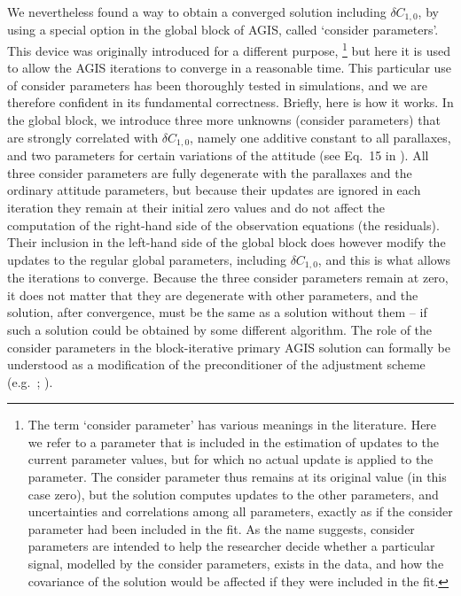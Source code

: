 \documentclass[longauth]{aa} %
\begin{document}
We nevertheless found a way to obtain a converged solution including $\delta C_{1,0}$, by
using a special option in the global block of AGIS, called `consider parameters'. This device
was originally introduced for a different purpose,%
\footnote{The term `consider parameter' has various meanings in
the literature. Here we refer to a parameter that is included in the
estimation of updates to the current parameter values, but for which
no actual update is applied to the parameter. The consider parameter thus remains
at its original value (in this case zero), but the solution computes updates to the
other parameters, and uncertainties and correlations among all parameters,
exactly as if the consider parameter had been included in the fit. As the name suggests,
consider parameters are intended to help the researcher decide whether a particular
signal, modelled by the consider parameters, exists in the data, and how the covariance
of the solution would be affected if they were included in the fit.}
but here it is used to allow the AGIS iterations to converge in a reasonable time.
This particular use of consider parameters has been thoroughly tested in simulations,
and we are therefore confident in its fundamental correctness. Briefly, here is how it
works. In the global block, we introduce three more unknowns (consider parameters) 
that are strongly correlated with $\delta C_{1,0}$, namely one additive constant to all 
parallaxes, and two parameters for certain variations of the attitude (see Eq.~15 in 
). All three consider parameters are fully degenerate with 
the parallaxes and the ordinary attitude parameters, but because their updates are ignored
in each iteration they remain at their initial zero values and do not affect the computation
of the right-hand side of the observation equations (the residuals). Their inclusion in
the left-hand side of the global block does however modify the updates to the regular
global parameters, including $\delta C_{1,0}$, and this is what allows the iterations to
converge. Because the three consider parameters remain at zero, it does not matter that
they are degenerate with other parameters, and the solution, after convergence, must be 
the same as a solution without them -- if such a solution could be obtained by some 
different algorithm. 
The role of the consider parameters in the block-iterative primary AGIS solution 
can formally be understood as a modification of the preconditioner of the adjustment 
scheme (e.g.\ \citealt{doi:10.1137/1.9780898718003}; ).
\end{document}
